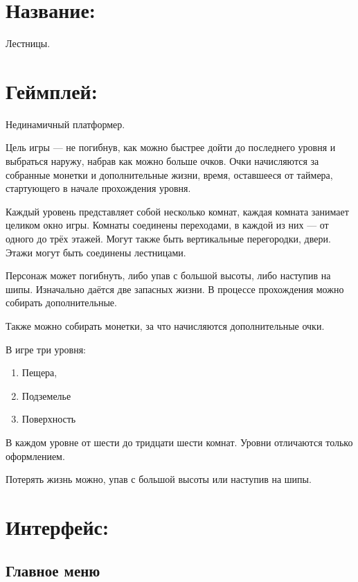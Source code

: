 \documentclass[12pt,a4paper,fullpage]{article}
\begin{document}
\newcommand{\pics}[3]{
	\begin{figure}[htbp!]
		\noindent 
		\texttt{[image: ./Pics/\#2]}
		\caption{#3}
	\end{figure}
	\FloatBarrier}

\section{Название:} Лестницы.\\

\section{Геймплей:} Нединамичный платформер.

Цель игры --- не погибнув, как можно быстрее дойти до последнего уровня и выбраться наружу, набрав как можно больше очков. Очки начисляются за собранные монетки и дополнительные жизни, время, оставшееся от таймера, стартующего в начале прохождения уровня.

Каждый уровень представляет собой несколько комнат, каждая комната занимает целиком окно игры. Комнаты соединены переходами, в каждой из них --- от одного до трёх этажей. Могут также быть вертикальные перегородки, двери. Этажи могут быть соединены лестницами.

Персонаж может погибнуть, либо упав с большой высоты, либо наступив на шипы. Изначально даётся две запасных жизни. В процессе прохождения можно собирать дополнительные.

Также можно собирать монетки, за что начисляются дополнительные очки.

В игре три уровня:
\begin{enumerate}
\item Пещера,
\item Подземелье
\item Поверхность
\end{enumerate}
В каждом уровне от шести до тридцати шести комнат. Уровни отличаются только оформлением.

Потерять жизнь можно, упав с большой высоты или наступив на шипы.\\

\section{Интерфейс:}
\subsection{Главное меню}
\end{document}
